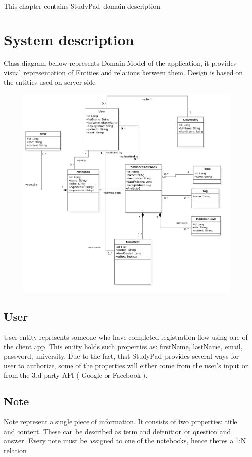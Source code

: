 \documentclass[thesis=B,english]{FITthesis}[2012/10/20]
\newcommand{\appname}{StudyPad}
\begin{document}
This chapter contains \appname\ domain description

\section{System description}

Class diagram bellow represents Domain Model of the application, it provides visual representation of Entities and relations between them. Design is based on the entities used on server-side

\begin{figure}[t]
	\includegraphics[scale=0.4]{Domain}
\end{figure}

\subsection{User}
	User entity represents someone who have completed registration flow using one of the client app. This entity holds such properties as: firstName, lastName, email, password, university. Due to the fact, that \appname\ provides several ways for user to authorize, some of the properties will either come from the user's input or from the 3rd party API ( Google or Facebook ).

	
\subsection{Note}
	Note represent a single piece of information. It consists of two properties: title and content. These can be described as term and defenition or question and answer. Every note must be assigned to one of the notebooks, hence theres a 1:N relation
\end{document}
